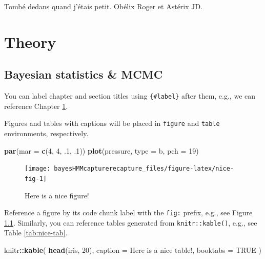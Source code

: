 \documentclass[
  12pt,
]{krantz}
\newenvironment{Shaded}{\begin{snugshade}}{\end{snugshade}}
\newcommand{\DataTypeTok}[1]{\textcolor[rgb]{0.13,0.29,0.53}{#1}}
\newcommand{\DecValTok}[1]{\textcolor[rgb]{0.00,0.00,0.81}{#1}}
\newcommand{\FloatTok}[1]{\textcolor[rgb]{0.00,0.00,0.81}{#1}}
\newcommand{\KeywordTok}[1]{\textcolor[rgb]{0.13,0.29,0.53}{\textbf{#1}}}
\newcommand{\NormalTok}[1]{#1}
\newcommand{\OperatorTok}[1]{\textcolor[rgb]{0.81,0.36,0.00}{\textbf{#1}}}
\newcommand{\OtherTok}[1]{\textcolor[rgb]{0.56,0.35,0.01}{#1}}
\newcommand{\StringTok}[1]{\textcolor[rgb]{0.31,0.60,0.02}{#1}}
\begin{document}
Tombé dedans quand j'étais petit. Obélix Roger et Astérix JD.

\mainmatter

\hypertarget{part-theory}{%
\part{Theory}\label{part-theory}}

\hypertarget{crashcourse}{%
\chapter{Bayesian statistics \& MCMC}\label{crashcourse}}

You can label chapter and section titles using \texttt{\{\#label\}} after them, e.g., we can reference Chapter \ref{crashcourse}.

Figures and tables with captions will be placed in \texttt{figure} and \texttt{table} environments, respectively.

\begin{Shaded}
\begin{Highlighting}[]
\KeywordTok{par}\NormalTok{(}\DataTypeTok{mar =} \KeywordTok{c}\NormalTok{(}\DecValTok{4}\NormalTok{, }\DecValTok{4}\NormalTok{, }\FloatTok{.1}\NormalTok{, }\FloatTok{.1}\NormalTok{))}
\KeywordTok{plot}\NormalTok{(pressure, }\DataTypeTok{type =} \StringTok{\textquotesingle{}b\textquotesingle{}}\NormalTok{, }\DataTypeTok{pch =} \DecValTok{19}\NormalTok{)}
\end{Highlighting}
\end{Shaded}

\begin{figure}

{\centering \texttt{[image: bayesHMMcapturerecapture\_files/figure-latex/nice-fig-1]} 

}

\caption{Here is a nice figure!}\label{fig:nice-fig}
\end{figure}

Reference a figure by its code chunk label with the \texttt{fig:} prefix, e.g., see Figure \ref{fig:nice-fig}. Similarly, you can reference tables generated from \texttt{knitr::kable()}, e.g., see Table \ref{tab:nice-tab}.

\begin{Shaded}
\begin{Highlighting}[]
\NormalTok{knitr}\OperatorTok{::}\KeywordTok{kable}\NormalTok{(}
  \KeywordTok{head}\NormalTok{(iris, }\DecValTok{20}\NormalTok{), }\DataTypeTok{caption =} \StringTok{\textquotesingle{}Here is a nice table!\textquotesingle{}}\NormalTok{,}
  \DataTypeTok{booktabs =} \OtherTok{TRUE}
\NormalTok{)}
\end{Highlighting}
\end{Shaded}
\end{document}
